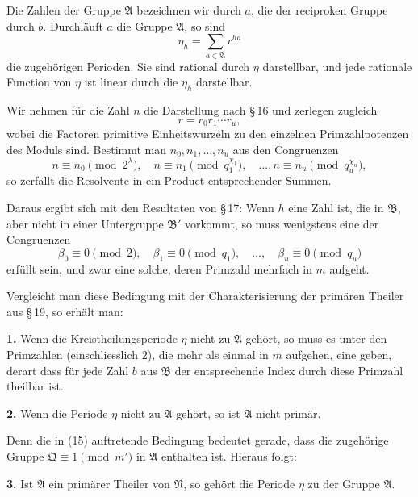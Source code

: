 \documentclass[11pt]{article}
\providecommand{\grpA}{\mathfrak A}
\providecommand{\grpB}{\mathfrak B}
\providecommand{\grpN}{\mathfrak N}
\providecommand{\grpQ}{\mathfrak Q}
\begin{document}
Die Zahlen der Gruppe $\grpA$ bezeichnen wir durch $a$, die der reciproken Gruppe durch $b$. Durchläuft $a$ die Gruppe $\grpA$, so sind
\begin{equation}
 \eta_h=\sum_{a\in\grpA} r^{ha}
\tag{3}
\end{equation}
die zugehörigen Perioden. Sie sind rational durch $\eta$ darstellbar, und jede rationale Function von $\eta$ ist linear durch die $\eta_h$ darstellbar.

Wir nehmen für die Zahl $n$ die Darstellung nach \S\,16 und zerlegen zugleich
\begin{equation}
 r=r_0r_1\cdots r_u,
\tag{12}
\end{equation}
wobei die Factoren primitive Einheitswurzeln zu den einzelnen Primzahlpotenzen des Moduls sind. Bestimmt man $n_0,n_1,
\ldots,n_u$ aus den Congruenzen
\begin{equation}
 n\equiv n_0\pmod {2^\lambda},\quad
 n\equiv n_1\pmod {q_1^{\chi_1}},\quad\ldots,
 n\equiv n_u\pmod {q_u^{\chi_u}},
\tag{13}
\end{equation}
so zerfällt die Resolvente in ein Product entsprechender Summen.

Daraus ergibt sich mit den Resultaten von \S\,17: Wenn $h$ eine Zahl ist, die in $\grpB$, aber nicht in einer Untergruppe $\grpB'$ vorkommt, so muss wenigstens eine der Congruenzen
\begin{equation}
 \beta_0\equiv0\pmod2,
 \quad\beta_1\equiv0\pmod {q_1},
 \quad\ldots,
 \quad\beta_u\equiv0\pmod {q_u}
\tag{15}
\end{equation}
erfüllt sein, und zwar eine solche, deren Primzahl mehrfach in $m$ aufgeht.

Vergleicht man diese Bedingung mit der Charakterisierung der primären Theiler aus \S\,19, so erhält man:

\medskip
\noindent\textbf{1.} Wenn die Kreistheilungsperiode $\eta$ nicht zu $\grpA$ gehört, so muss es unter den Primzahlen (einschliesslich $2$), die mehr als einmal in $m$ aufgehen, eine geben, derart dass für jede Zahl $b$ aus $\grpB$ der entsprechende Index durch diese Primzahl theilbar ist.

\medskip
\noindent\textbf{2.} Wenn die Periode $\eta$ nicht zu $\grpA$ gehört, so ist $\grpA$ nicht primär.

Denn die in (15) auftretende Bedingung bedeutet gerade, dass die zugehörige Gruppe $\grpQ\equiv1\pmod {m'}$ in $\grpA$ enthalten ist. Hieraus folgt:

\medskip
\noindent\textbf{3.} Ist $\grpA$ ein primärer Theiler von $\grpN$, so gehört die Periode $\eta$ zu der Gruppe $\grpA$.
\end{document}
